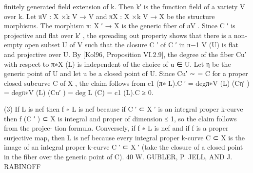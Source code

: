\documentclass[
  10pt,
]{article}
\newenvironment{Shaded}{}{}
\newcommand{\NormalTok}[1]{#1}
\begin{document}
\begin{Shaded}
\begin{Highlighting}[]
\NormalTok{finitely generated field extension of k. Then k′ is the function field of a variety V over k.}
\NormalTok{Let πV : X ×k V → V and πX : X ×k V → X be the structure morphisms. The morphism}
\NormalTok{π: X ′ → X is the generic fiber of πV . Since C ′ is projective and flat over k′ , the spreading}
\NormalTok{out property shows that there is a non{-}empty open subset U of V such that the closure C ′}
\NormalTok{of C ′ in π−1}
\NormalTok{            V}
\NormalTok{              (U) is flat and projective over U. By [Kol96, Proposition VI.2.9], the degree}
\NormalTok{of the fiber Cu′ with respect to π∗X (L) is independent of the choice of u ∈ U. Let η be the}
\NormalTok{generic point of U and let u be a closed point of U. Since Cu′ ∼      = C for a proper closed}
\NormalTok{subcurve C of X , the claim follows from}
\NormalTok{            c1 (π∗ L).C ′ = degπ∗V (L) (Cη′ ) = degπ∗V (L) (Cu′ ) = deg L (C) = c1 (L).C ≥ 0.}

\NormalTok{   (3) If L is nef then f ∗ L is nef because if C ′ ⊂ X ′ is an integral proper k{-}curve then}
\NormalTok{f (C ′ ) ⊂ X is integral and proper of dimension ≤ 1, so the claim follows from the projec{-}}
\NormalTok{tion formula. Conversely, if f ∗ L is nef and if f is a proper surjective map, then L is nef}
\NormalTok{because every integral proper k{-}curve C ⊂ X is the image of an integral proper k{-}curve}
\NormalTok{C ′ ⊂ X ′ (take the closure of a closed point in the fiber over the generic point of C). }
\NormalTok{40                              W. GUBLER, P. JELL, AND J. RABINOFF}


\end{Highlighting}
\end{Shaded}
\end{document}

